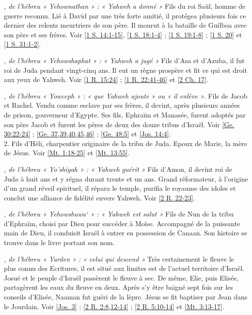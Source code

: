 \begin{multicols}{2}
\textit{, de l'hébreu « Yehownathan » : « Yahweh a donné »}\newline
Fils du roi Saül, homme de guerre reconnu. Lié à David par une très forte amitié, il protégea plusieurs fois ce dernier des relents meurtriers de son père. Il mourut à la bataille de Guilboa avec son père et ses frères. Voir \vref{1 S. 14:1-15}, \vref{1 S. 18:1-4} ; \vref{1 S. 19:1-8} ; \vref{1 S. 20} et \vref{1 S. 31:1-2}.

\textit{, de l'hébreu « Yehowshaphat » : « Yahweh a jugé »}\newline
Fils d'Asa et d'Azuba, il fut roi de Juda pendant vingt-cinq ans. Il eut un règne prospère et fit ce qui est droit aux yeux de Yahweh. Voir \vref{1 R. 15:24} ; \vref{1 R. 22:41-46} et \vref{2 Ch. 17}.

\textit{, de l'hébreu « Yowceph » : « que Yahweh ajoute » ou « il enlève »}. Fils de Jacob et Rachel. Vendu comme esclave par ses frères, il devint, après plusieurs années de prison, gouverneur d'Egypte. Ses fils, Ephraïm et Manasée, furent adoptés par son père Jacob et furent les pères de deux des douze tribus d'Israël. Voir \vref{Ge. 30:22-24} ; \vref{Ge. 37,39,40,45,46} ; \vref{Ge. 48:5} et \vref{Jos. 14:4}.
\\2. Fils d'Héli, charpentier originaire de la tribu de Juda. Epoux de Marie, la mère de Jésus. Voir \vref{Mt. 1:18-25} et \vref{Mt. 13:55}.

\textit{, de l'hébreu « Yo'shiyah » : « Yahweh guérit »}\newline
Fils d'Amon, il devint roi de Juda à huit ans et y régna durant trente et un ans. Grand réformateur, à l'origine d'un grand réveil spirituel, il répara le temple, purifia le royaume des idoles et conclut une alliance de fidélité envers Yahweh. Voir \vref{2 R. 22-23}.

\textit{, de l'hébreu « Yehowshuwa` » : « Yahweh est salut »}\newline
Fils de Nun de la tribu d'Ephraïm, choisi par Dieu pour succéder à Moïse. Accompagné de la puissante main de Dieu, il conduisit Israël à entrer en possession de Canaan. Son histoire se trouve dans le livre portant son nom.

\textit{, de l'hébreu « Yarden » : « celui qui descend »}\newline
Très certainement le fleuve le plus connu des Ecritures, il est situé aux limites est de l'actuel territoire d'Israël. Josué et le peuple d'Israël passèrent le fleuve à sec. De même, Elie, puis Elisée, partagèrent les eaux du fleuve en deux. Après s'y être baigné sept fois sur les conseils d'Elisée, Naaman fut guéri de la lèpre. Jésus se fit baptiser par Jean dans le Jourdain. Voir \vref{Jos. 3} ; \vref{2 R. 2:8,12-14} ; \vref{2 R. 5:10-14} et \vref{Mt. 3:13-17}.


\end{multicols}
